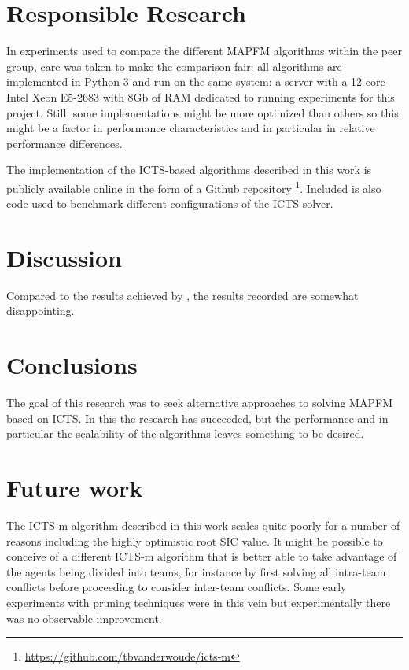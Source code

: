 \documentclass[english]{article}
\begin{document}
	
	\section{Responsible Research}
	In experiments used to compare the different MAPFM algorithms within the peer group, care was taken to make the comparison fair: all algorithms are implemented in Python 3 and run on the same system: a server with a 12-core Intel Xeon E5-2683 with 8Gb of RAM dedicated to running experiments for this project. Still, some implementations might be more optimized than others so this might be a factor in performance characteristics and in particular in relative performance differences.
	
	The implementation of the ICTS-based algorithms described in this work is publicly available online in the form of a Github repository \footnote{\url{https://github.com/tbvanderwoude/icts-m}}. Included is also code used to benchmark different configurations of the ICTS solver.
	
	\section{Discussion}
	Compared to the results achieved by \cite{ma2016}, the results recorded are somewhat disappointing.
	\section{Conclusions}
	The goal of this research was to seek alternative approaches to solving MAPFM based on ICTS. In this the research has succeeded, but the performance and in particular the scalability of the algorithms leaves something to be desired. 
	\section{Future work}
	The ICTS-m algorithm described in this work scales quite poorly for a number of reasons including the highly optimistic root SIC value. It might be possible to conceive of a different ICTS-m algorithm that is better able to take advantage of the agents being divided into teams, for instance by first solving all intra-team conflicts before proceeding to consider inter-team conflicts. Some early experiments with pruning techniques were in this vein but experimentally there was no observable improvement.
	\printbibliography
	
\end{document}
